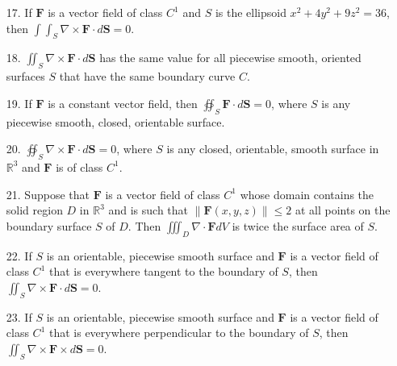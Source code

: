 \documentclass[11pt,letterpaper,boxed]{hmcpset}
\newcommand{\R}{\mathbb{R}}
\newcommand{\magn}[1]{\left\lVert #1 \right\rVert}
\newcommand{\VEC}[1]{\ensuremath{\mathbf{#1}}\xspace}
\begin{document}
\begin{problem}
\begin{enumerate}
\item[17.] If $\VEC{F}$ is a vector field of class $C^1$ and $S$ is the ellipsoid $x^2+4y^2+9z^2=36$, then $\int\int_S\nabla\times\VEC{F}\cdot d\VEC{S}=0$.
\item[18.] $\iint_S\nabla\times\VEC{F}\cdot d\VEC{S}$ has the same value for all piecewise smooth, oriented surfaces $S$ that have the same boundary curve $C$.
\item[19.] If $\VEC{F}$ is a constant vector field, then $\oiint_S	\VEC{F}\cdot d\VEC{S}=0$, where $S$ is any piecewise smooth, closed, orientable surface.
\item[20.] $\oiint_S\nabla\times\VEC{F}\cdot d\VEC{S}=0$, where $S$ is any closed, orientable, smooth surface in $\R^3$ and $\VEC{F}$ is of class $C^1$.
\item[21.] Suppose that $\VEC{F}$ is a vector field of class $C^1$ whose domain contains the solid region $D$ in $\R^3$ and is such that $\magn{\VEC{F}(x,y,z)}\leq2$ at all 
points on the boundary surface $S$ of $D$. Then $\iiint_D \nabla\cdot \VEC{F} dV$ is twice the surface area of $S$.
\item[22.] If $S$ is an orientable, piecewise smooth surface and $\VEC{F}$ is a vector field of class $C^1$ that is everywhere tangent to the boundary of $S$,
then $\iint_S\nabla\times\VEC{F}\cdot d\VEC{S}=0$.
\item[23.] If $S$ is an orientable, piecewise smooth surface and $\VEC{F}$ is a vector field of class $C^1$ that is everywhere perpendicular to the boundary of $S$,
then $\iint_S\nabla\times\VEC{F}\times d\VEC{S}=0$.
\end{enumerate}
\end{problem}

\begin{solution}
\vfill
\end{solution}
\newpage
\end{document}
